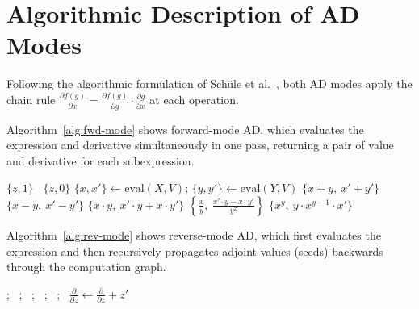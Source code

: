 \documentclass[12pt]{report}
\begin{document}
\section{Algorithmic Description of AD Modes}

Following the algorithmic formulation of Schüle et
al.~\cite{schule2022llvm}, both AD modes apply the chain rule
$\frac{\partial f(g)}{\partial x} = \frac{\partial f(g)}{\partial g}
\cdot \frac{\partial g}{\partial x}$ at each operation.

Algorithm~\ref{alg:fwd-mode} shows forward-mode AD, which
evaluates the expression and derivative simultaneously in one pass,
returning a pair of value and derivative for each subexpression.

\begin{algorithm}[H]
\caption{Forward Mode AD (after Schüle et al.~\cite{schule2022llvm})}
\label{alg:fwd-mode}
\begin{algorithmic}
         \Return $\{z, 1\}$
        \Else\ \Return $\{z, 0\}$
        \EndIf
    \Else
        \State $\{x, x'\} \leftarrow \text{eval}(X, V)$;
               $\{y, y'\} \leftarrow \text{eval}(Y, V)$
         \Return $\{x+y,\ x'+y'\}$
         \Return $\{x-y,\ x'-y'\}$
         \Return $\{x \cdot y,\ x' \cdot y + x \cdot y'\}$
         \Return $\left\{\frac{x}{y},\ \frac{x' \cdot y - x \cdot y'}{y^2}\right\}$
         \Return $\{x^y,\ y \cdot x^{y-1} \cdot x'\}$
        \EndIf
    \EndIf
\EndFunction
\end{algorithmic}
\end{algorithm}

Algorithm~\ref{alg:rev-mode} shows reverse-mode AD, which first
evaluates the expression and then recursively propagates adjoint
values (seeds) backwards through the computation graph.

\begin{algorithm}[H]
\caption{Reverse Mode AD (after Schüle et al.~\cite{schule2022llvm})}
\label{alg:rev-mode}
\begin{algorithmic}
        \State {};\ 
        \State {};\ 
        \State {};\ 
        \State {};\ 
        \State {};\ 
        \State $\frac{\partial}{\partial z} \leftarrow \frac{\partial}{\partial z} + z'$
    \EndIf
\EndFunction
\end{algorithmic}
\end{algorithm}
\end{document}
